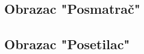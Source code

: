 \subsection{Obrazac "Posmatrač"}
\label{subsec:DesignPatternsObserver}




\subsection{Obrazac "Posetilac"}
\label{subsec:DesignPatternsListener}

